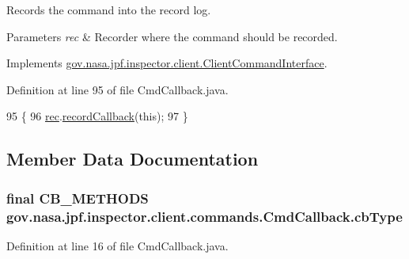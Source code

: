 Records the command into the record log. 


\begin{DoxyParams}{Parameters}
{\em rec} & Recorder where the command should be recorded. \\
\hline
\end{DoxyParams}


Implements \hyperlink{interfacegov_1_1nasa_1_1jpf_1_1inspector_1_1client_1_1_client_command_interface_a4ae9ac9bbb61d9a758ef168e8b3b04ff}{gov.\+nasa.\+jpf.\+inspector.\+client.\+Client\+Command\+Interface}.



Definition at line 95 of file Cmd\+Callback.\+java.


\begin{DoxyCode}
95                                                   \{
96     \hyperlink{classgov_1_1nasa_1_1jpf_1_1inspector_1_1client_1_1_client_command_af4246f2427035c72a6af45a2c61361f7}{rec}.\hyperlink{classgov_1_1nasa_1_1jpf_1_1inspector_1_1client_1_1_command_recorder_abe21b5a43baac419c36c34b5f35e2e50}{recordCallback}(\textcolor{keyword}{this});
97   \}
\end{DoxyCode}


\subsection{Member Data Documentation}
\subsubsection[{\texorpdfstring{cb\+Type}{cbType}}]{\setlength{\rightskip}{0pt plus 5cm}final {\bf C\+B\+\_\+\+M\+E\+T\+H\+O\+DS} gov.\+nasa.\+jpf.\+inspector.\+client.\+commands.\+Cmd\+Callback.\+cb\+Type\hspace{0.3cm}{\ttfamily [private]}}\hypertarget{classgov_1_1nasa_1_1jpf_1_1inspector_1_1client_1_1commands_1_1_cmd_callback_a3fdc749dfa288c4bd4a72b5235539e91}{}\label{classgov_1_1nasa_1_1jpf_1_1inspector_1_1client_1_1commands_1_1_cmd_callback_a3fdc749dfa288c4bd4a72b5235539e91}


Definition at line 16 of file Cmd\+Callback.\+java.

